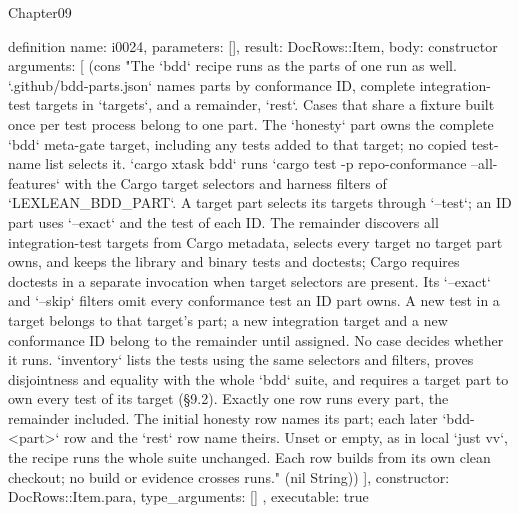 \begin{lexlean}{Chapter09}
\begin{semanticmodule}
definition{
  name: i0024,
  parameters: [],
  result: DocRows::Item,
  body: constructor{
    arguments: [
      (cons "The `bdd` recipe runs as the parts of one run as well. `.github/bdd-parts.json` names parts by conformance ID, complete integration-test targets in `targets`, and a remainder, `rest`. Cases that share a fixture built once per test process belong to one part. The `honesty` part owns the complete `bdd` meta-gate target, including any tests added to that target; no copied test-name list selects it. `cargo xtask bdd` runs `cargo test -p repo-conformance --all-features` with the Cargo target selectors and harness filters of `LEXLEAN_BDD_PART`. A target part selects its targets through `--test`; an ID part uses `--exact` and the test of each ID. The remainder discovers all integration-test targets from Cargo metadata, selects every target no target part owns, and keeps the library and binary tests and doctests; Cargo requires doctests in a separate invocation when target selectors are present. Its `--exact` and `--skip` filters omit every conformance test an ID part owns. A new test in a target belongs to that target's part; a new integration target and a new conformance ID belong to the remainder until assigned. No case decides whether it runs. `inventory` lists the tests using the same selectors and filters, proves disjointness and equality with the whole `bdd` suite, and requires a target part to own every test of its target (§9.2). Exactly one row runs every part, the remainder included. The initial honesty row names its part; each later `bdd-<part>` row and the `rest` row name theirs. Unset or empty, as in local `just vv`, the recipe runs the whole suite unchanged. Each row builds from its own clean checkout; no build or evidence crosses runs." (nil String))
    ],
    constructor: DocRows::Item.para,
    type_arguments: []
  },
  executable: true
}


\end{semanticmodule}
\end{lexlean}
